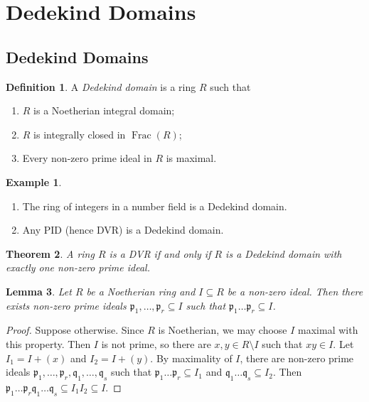 \documentclass[11pt]{article}
\theoremstyle{definition}
\newtheorem{definition}{Definition}[subsection]
\newtheorem*{example}{Example}
\theoremstyle{plain}
\newtheorem{theorem}[definition]{Theorem}
\newtheorem{lemma}[definition]{Lemma}
\theoremstyle{remark}
\DeclareMathOperator{\Frac}{Frac}
\newcommand{\fp}{\mathfrak{p}}
\newcommand{\fq}{\mathfrak{q}}
\begin{document}
\section{Dedekind Domains}

\subsection{Dedekind Domains}

\begin{definition}\label{def:9_1}
    A \emph{Dedekind domain} is a ring $R$ such that
    \begin{enumerate}
        \item $R$ is a Noetherian integral domain;
        \item $R$ is integrally closed in $\Frac(R)$;
        \item Every non-zero prime ideal in $R$ is maximal.
    \end{enumerate}
\end{definition}

\begin{example}\phantom{}
    \begin{enumerate}
        \item The ring of integers in a number field is a Dedekind domain.
        \item Any PID (hence DVR) is a Dedekind domain.
    \end{enumerate}
\end{example}

\begin{theorem}\label{thm:9_2}
    A ring $R$ is a DVR if and only if $R$ is a Dedekind domain with exactly one non-zero prime ideal.
\end{theorem}

\begin{lemma}\label{lem:9_3}
    Let $R$ be a Noetherian ring and $I \subseteq R$ be a non-zero ideal. Then there exists non-zero prime ideals $\fp_1, \ldots, \fp_r \subseteq I$ such that $\fp_1 \ldots \fp_r \subseteq I$.
\end{lemma}
\begin{proof}
    Suppose otherwise. Since $R$ is Noetherian, we may choose $I$ maximal with this property. Then $I$ is not prime, so there are $x, y \in R \setminus I$ such that $xy \in I$. Let $I_1 = I + (x)$ and $I_2 = I + (y)$. By maximality of $I$, there are non-zero prime ideals $\fp_1, \ldots, \fp_r, \fq_1, \ldots, \fq_s$ such that $\fp_1 \ldots \fp_r \subseteq I_1$ and $\fq_1 \ldots \fq_s \subseteq I_2$. Then $\fp_1 \ldots \fp_r \fq_1 \ldots \fq_s \subseteq I_1 I_2 \subseteq I$.
\end{proof}
\end{document}

